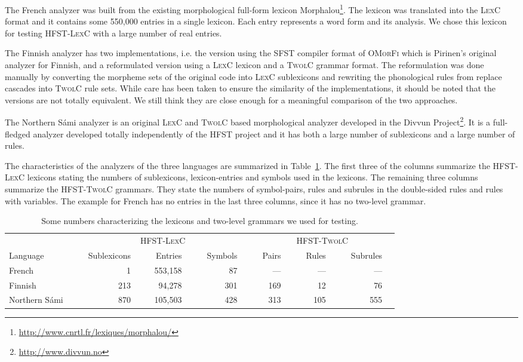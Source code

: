 \documentclass[postprint]{flammie}
\begin{document}
The French analyzer was built from the existing morphological
full-form lexicon
Morphalou\footnote{\url{http://www.cnrtl.fr/lexiques/morphalou/}}. The
lexicon was translated into the \textsc{LexC} format and it contains
some 550,000 entries in a single lexicon. Each entry represents a word
form and its analysis. We chose this lexicon for testing
\textsc{HFST-LexC} with a large number of real entries.

The Finnish analyzer has two implementations, i.e. the version using
the \textsc{SFST} compiler format of \textsc{OMorFi} which is
Pirinen's \cite{pirinen2008} original analyzer for Finnish, and a
reformulated version using a \textsc{LexC} lexicon and a
\textsc{TwolC} grammar format. The reformulation was done manually by
converting the morpheme sets of the original code into \textsc{LexC}
sublexicons and rewriting the phonological rules from replace cascades
into \textsc{TwolC} rule sets.  While care has been taken to ensure
the similarity of the implementations, it should be noted that the
versions are not totally equivalent.  We still think they are close
enough for a meaningful comparison of the two approaches.

The Northern S\'{a}mi analyzer is an original \textsc{LexC} and
\textsc{TwolC} based morphological analyzer developed in the Divvun
Project\footnote{\url{http://www.divvun.no}}. It is a full-fledged
analyzer developed totally independently of the \textsc{HFST} project
and it has both a large number of sublexicons and a large number of
rules.

The characteristics of the analyzers of the three languages are
summarized in Table~\ref{fig:lexicon-sizes}. The first three of the
columns summarize the \textsc{HFST-LexC} lexicons stating the numbers
of sublexicons, lexicon-entries and symbols used in the lexicons. The
remaining three columns summarize the \textsc{HFST-TwolC} grammars.
They state the numbers of symbol-pairs, rules and subrules in the
double-sided rules and rules with variables. The example for French
has no entries in the last three columns, since it has no two-level
grammar.

\begin{table}[!h]
  \begin{center}
    \begin{tabular}{l|rrr|rrr}
      \hline
      & \multicolumn{3}{|c}{\textsc{HFST-LexC}} & \multicolumn{3}{|c}{\textsc{HFST-TwolC}} \\
      Language & ~~Sublexicons~~ & ~~Entries~~ & ~~Symbols~~ & ~~Pairs~~ & ~~Rules~~ & ~~Subrules~~\\
      \hline
      French & 1~~ & 553,158~~ & 87~~ & ---~~ & ---~~ & ---~~ \\
      Finnish & 213~~ & 94,278~~ & 301~~ & 169~~ & 12~~ & 76~~ \\
      Northern S\'ami~~ & 870~~ & 105,503~~ & 428~~ & 313~~ & 105~~ & 555~~ \\ 
      \hline
    \end{tabular}
    \vskip0.5cm
  \end{center}
  \caption{Some numbers characterizing the lexicons and two-level
  grammars we used for testing.}\label{fig:lexicon-sizes}
\end{table}
\end{document}
